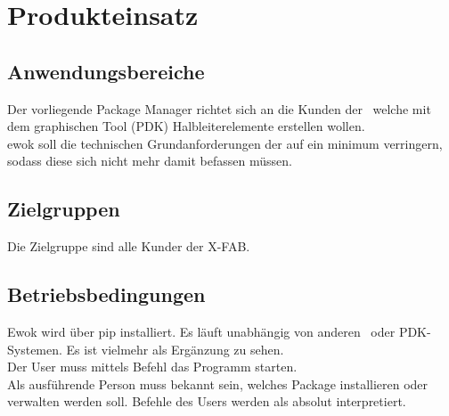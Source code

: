 \chapter{Produkteinsatz}

\section{Anwendungsbereiche}
Der vorliegende Package Manager richtet sich an die Kunden der \x~welche mit dem graphischen Tool (PDK) Halbleiterelemente erstellen wollen. \\
ewok soll die technischen Grundanforderungen der  auf ein minimum verringern, sodass diese sich nicht mehr damit befassen müssen.

\section{Zielgruppen}
Die Zielgruppe sind alle Kunder der X-FAB.


\section{Betriebsbedingungen}
Ewok wird über pip installiert. Es läuft unabhängig von anderen \x~oder PDK-Systemen. Es ist vielmehr als Ergänzung zu sehen.\\
Der User muss mittels Befehl das Programm starten.\\
Als ausführende Person muss bekannt sein, welches Package installieren oder verwalten werden soll. Befehle des Users werden als absolut interpretiert. 
